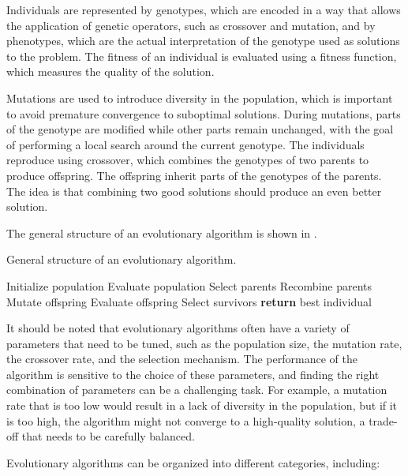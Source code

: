 Individuals are represented by genotypes, which are encoded in a way that allows the application of genetic operators, such as crossover and mutation, and
by phenotypes, which are the actual interpretation of the genotype used as solutions to the problem. The fitness of an individual is evaluated using a
fitness function, which measures the quality of the solution.

Mutations are used to introduce diversity in the population, which is important to avoid premature convergence to suboptimal solutions. During mutations,
parts of the genotype are modified while other parts remain unchanged, with the goal of performing a local search around the current genotype.
The individuals reproduce using crossover, which combines the genotypes of two parents to produce offspring. The offspring inherit parts of the genotypes
of the parents. The idea is that combining two good solutions should produce an even better solution.

The general structure of an evolutionary algorithm is shown in .

\begin{algorithm}[H]
    \caption{General structure of an evolutionary algorithm.}
    \label{alg:ea}
    \begin{algorithmic}
        \State Initialize population
        \State Evaluate population
            \State Select parents
            \State Recombine parents
            \State Mutate offspring
            \State Evaluate offspring
            \State Select survivors
        \EndWhile
        \State \textbf{return} best individual
    \end{algorithmic}
\end{algorithm}

It should be noted that evolutionary algorithms often have a variety of parameters that need to be tuned, such as the population size, the mutation rate,
the crossover rate, and the selection mechanism. The performance of the algorithm is sensitive to the choice of these parameters, and finding the
right combination of parameters can be a challenging task. For example, a mutation rate that is too low would result in a lack of diversity in the population, but if
it is too high, the algorithm might not converge to a high-quality solution, a trade-off that needs to be carefully balanced.

Evolutionary algorithms can be organized into different categories, including:

